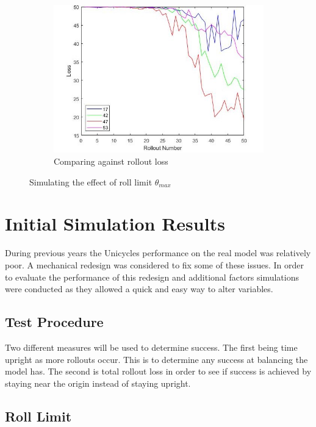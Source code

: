\documentclass[twoside,twocolumn,12pt]{article}
\begin{document}
\begin{figure}[ht!]
\begin{subfigure}[t]{0.325\textwidth}
    \includegraphics[width=\linewidth]{average_angle_loss}
    \caption{Comparing against rollout loss}
  \label{fig:rl}
  \end{subfigure}
  \caption{Simulating the effect of roll limit $\theta_{max}$ }
  \label{fig:rolllimit}
\end{figure}
\section{Initial Simulation Results}

During previous years the Unicycles performance on the real model was relatively poor. A mechanical redesign was considered to fix some of these issues. In order to evaluate the performance of this redesign and additional factors simulations were conducted as they allowed a quick and easy way to alter variables.

\subsection{Test Procedure}

Two different measures will be used to determine success. The first being time upright as more rollouts occur. This is to determine any success at balancing the model has. The second is total rollout loss in order to see if success is achieved by staying near the origin instead of staying upright.
\subsection{Roll Limit}
\end{document}
